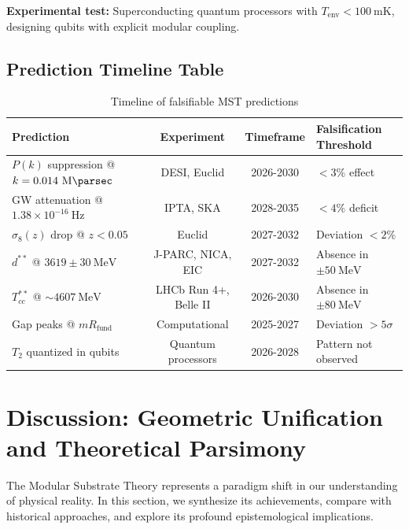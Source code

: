 \documentclass[11pt, a4paper]{article}
\theoremstyle{plain}
\theoremstyle{definition}
\newcommand{\Rfactor}{R_{\text{fund}}}
\begin{document}
\textbf{Experimental test:} Superconducting quantum processors with $T_{\text{env}} < 100\ \si{\milli\kelvin}$, designing qubits with explicit modular coupling.

\subsection{Prediction Timeline Table}

\begin{table}[H]
\centering
\caption{Timeline of falsifiable MST predictions}
\label{tab:prediction_timeline}
\begin{tabular}{p{4.5cm}ccp{4cm}}
\toprule
\textbf{Prediction} & \textbf{Experiment} & \textbf{Timeframe} & \textbf{Falsification Threshold} \\
\midrule
$P(k)$ suppression @ $k=0.014\ \si{\per\mega\parsec}$ & DESI, Euclid & 2026-2030 & $< 3\%$ effect \\
GW attenuation @ $1.38\times10^{-16}\ \si{\hertz}$ & IPTA, SKA & 2028-2035 & $< 4\%$ deficit \\
$\sigma_8(z)$ drop @ $z<0.05$ & Euclid & 2027-2032 & Deviation $< 2\%$ \\
\addlinespace
$d^{**}$ @ $3619 \pm 30\ \si{\mega\electronvolt}$ & J-PARC, NICA, EIC & 2027-2032 & Absence in $\pm 50\ \si{\mega\electronvolt}$ \\
$T_{cc}^{**}$ @ $\sim 4607\ \si{\mega\electronvolt}$ & LHCb Run 4+, Belle II & 2026-2030 & Absence in $\pm 80\ \si{\mega\electronvolt}$ \\
\addlinespace
Gap peaks @ $m\Rfactor$ & Computational & 2025-2027 & Deviation $> 5\sigma$ \\
$T_2$ quantized in qubits & Quantum processors & 2026-2028 & Pattern not observed \\
\bottomrule
\end{tabular}
\end{table}


\section{Discussion: Geometric Unification and Theoretical Parsimony}
\label{sec:discussion}

The Modular Substrate Theory represents a paradigm shift in our understanding of physical reality. In this section, we synthesize its achievements, compare with historical approaches, and explore its profound epistemological implications.
\end{document}
